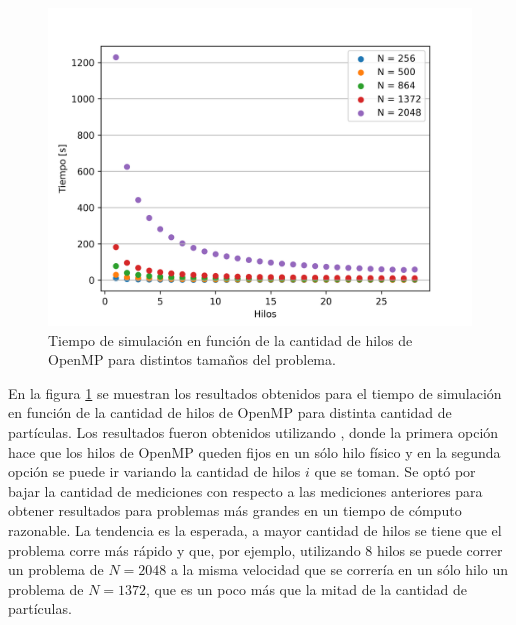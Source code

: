 \documentclass[a4paper,spanish,12pt,twoside]{article}
\begin{document}
\begin{figure}[h]
	\centering
	\includegraphics[width=.8\textwidth]{3-omp-tiempo.png}
	\caption{Tiempo de simulación en función de la cantidad de hilos de OpenMP para distintos tamaños del problema.}\label{fig:omp-tiempo}
\end{figure}
En la figura \ref{fig:omp-tiempo} se muestran los resultados obtenidos para el tiempo de simulación en función de la cantidad de hilos de OpenMP para distinta cantidad de partículas. Los resultados fueron obtenidos utilizando , donde la primera opción hace que los hilos de OpenMP queden fijos en un sólo hilo físico y en la segunda opción se puede ir variando la cantidad de hilos $i$ que se toman. Se optó por bajar la cantidad de mediciones con respecto a las mediciones anteriores para obtener resultados para problemas más grandes en un tiempo de cómputo razonable.
La tendencia es la esperada, a mayor cantidad de hilos se tiene que el problema corre más rápido y que, por ejemplo, utilizando 8 hilos se puede correr un problema de $N = 2048$ a la misma velocidad que se correría en un sólo hilo un problema de $N = 1372$, que es un poco más que la mitad de la cantidad de partículas.
\end{document}
